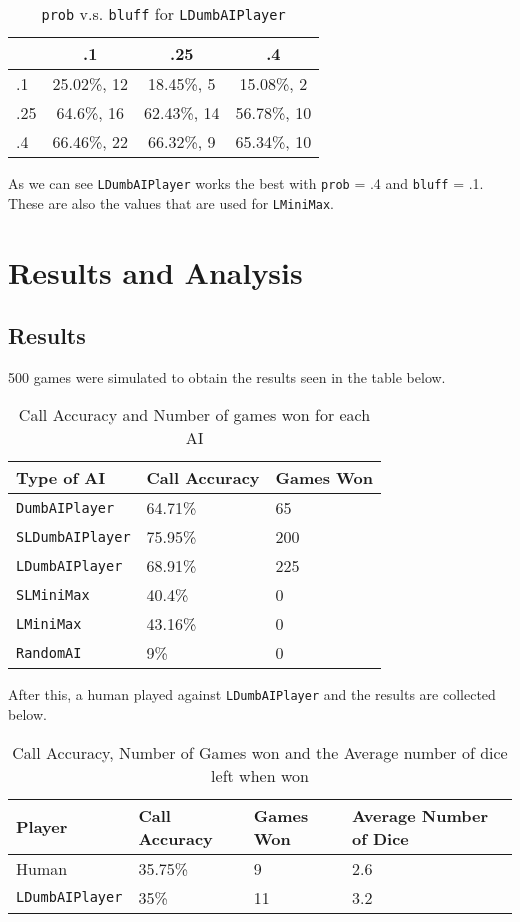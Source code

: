 \begin{table}
    \centering
    \begin{tabular}{l|ccc}
        &.1&.25&.4\\
        \hline
        .1&25.02\%, 12& 18.45\%, 5& 15.08\%, 2\\
        .25&64.6\%, 16& 62.43\%, 14& 56.78\%, 10\\
        .4&66.46\%, 22& 66.32\%, 9& 65.34\%, 10
    \end{tabular}
    \caption{\texttt{prob} v.s. \texttt{bluff} for \texttt{LDumbAIPlayer}}
    \label{table:res3}
\end{table}

As we can see \texttt{LDumbAIPlayer} works the best with \texttt{prob} = .4 and \texttt{bluff} = .1. These are also the values that are used for \texttt{LMiniMax}.

\section{Results and Analysis}


\subsection{Results}

500 games were simulated to obtain the results seen in the table below.

\begin{table}
    \centering
    \begin{tabular}{l|l|l}
        Type of AI&Call Accuracy & Games Won\\
        \hline
        \texttt{DumbAIPlayer} & 64.71\% & 65\\
        \texttt{SLDumbAIPlayer} & 75.95\% & 200\\
        \texttt{LDumbAIPlayer} & 68.91\% & 225\\
        \texttt{SLMiniMax} & 40.4\% & 0\\
        \texttt{LMiniMax} & 43.16\% & 0\\
        \texttt{RandomAI} & 9\% & 0
    \end{tabular}
    \caption{Call Accuracy and Number of games won for each AI}
    \label{table:res6}
\end{table}

After this, a human played against \texttt{LDumbAIPlayer} and the results are collected below.

\begin{table}
    \centering
    \begin{tabular}{l|l|l|l}
        Player & Call Accuracy & Games Won & Average Number of Dice\\
        \hline
        Human & 35.75\% & 9& 2.6\\
        \texttt{LDumbAIPlayer} & 35\% & 11 & 3.2
    \end{tabular}
    \caption{Call Accuracy, Number of Games won and the Average number of dice left when won}
    \label{table:res7}
\end{table}

